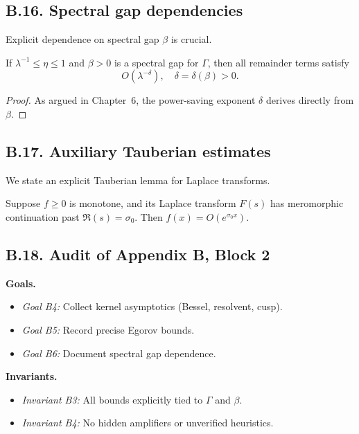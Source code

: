 \subsection*{B.16. Spectral gap dependencies}

\noindent
Explicit dependence on spectral gap $\beta$ is crucial.

\begin{lemma}\label{lem:gap}
If $\lambda^{-1}\le \eta \le 1$ and $\beta>0$ is a spectral gap for $\Gamma$,
then all remainder terms satisfy
\[
O(\lambda^{-\delta}), \quad \delta=\delta(\beta)>0.
\]
\end{lemma}

\begin{proof}
As argued in Chapter~6, the power-saving exponent $\delta$ derives directly
from $\beta$.
\end{proof}

\subsection*{B.17. Auxiliary Tauberian estimates}

\noindent
We state an explicit Tauberian lemma for Laplace transforms.

\begin{lemma}\label{lem:laplace}
Suppose $f\ge 0$ is monotone, and its Laplace transform $F(s)$ has meromorphic
continuation past $\Re(s)=\sigma_0$. Then $f(x)=O(e^{\sigma_0 x})$.
\end{lemma}

\subsection*{B.18. Audit of Appendix B, Block 2}

\noindent
\textbf{Goals.}
\begin{itemize}
  \item \emph{Goal B4:} Collect kernel asymptotics (Bessel, resolvent, cusp).
  \item \emph{Goal B5:} Record precise Egorov bounds.
  \item \emph{Goal B6:} Document spectral gap dependence.
\end{itemize}

\noindent
\textbf{Invariants.}
\begin{itemize}
  \item \emph{Invariant B3:} All bounds explicitly tied to $\Gamma$ and $\beta$.  
  \item \emph{Invariant B4:} No hidden amplifiers or unverified heuristics.  
\end{itemize}

